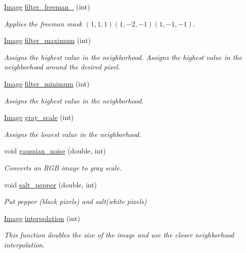 \begin{DoxyCompactItemize}
\hyperlink{class_image}{Image} \hyperlink{class_image_abc60e72c623751597eaa64a5c295e65f}{filter\-\_\-freeman\-\_} (int)
\begin{DoxyCompactList}\small\item\em Applies the freeman mask $(1,1,1)(1,-2,-1)(1,-1,-1)$. \end{DoxyCompactList}\item 
\hyperlink{class_image}{Image} \hyperlink{class_image_a42ddfccab80370efd993590850669837}{filter\-\_\-maximum} (int)
\begin{DoxyCompactList}\small\item\em Assigns the highest value in the neighborhood. Assigns the highest value in the neighborhood around the desired pixel. \end{DoxyCompactList}\item 
\hyperlink{class_image}{Image} \hyperlink{class_image_af37690485375d17d0c55a3d89e5c0292}{filter\-\_\-minimum} (int)
\begin{DoxyCompactList}\small\item\em Assigns the highest value in the neighborhood. \end{DoxyCompactList}\item 
\hyperlink{class_image}{Image} \hyperlink{class_image_ab9ffca5856cd3e5032166d312719333d}{gray\-\_\-scale} (int)
\begin{DoxyCompactList}\small\item\em Assigns the lowest value in the neighborhood. \end{DoxyCompactList}\item 
void \hyperlink{class_image_a16390bf8509b67dedec6ca9ece27eb39}{gaussian\-\_\-noise} (double, int)
\begin{DoxyCompactList}\small\item\em Converts an R\-G\-B image to gray scale. \end{DoxyCompactList}\item 
void \hyperlink{class_image_a1afcd22275fa41ca473fc419719d3389}{salt\-\_\-pepper} (double, int)
\begin{DoxyCompactList}\small\item\em Put pepper (black pixels) and salt(white pixels) \end{DoxyCompactList}\item 
\hyperlink{class_image}{Image} \hyperlink{class_image_ae6f9753e39897f50a1483f32fb84133b}{interpolation} (int)
\begin{DoxyCompactList}\small\item\em This function doubles the size of the image and use the closer neighborhood interpolation. \end{DoxyCompactList}\item 

\end{DoxyCompactItemize}
